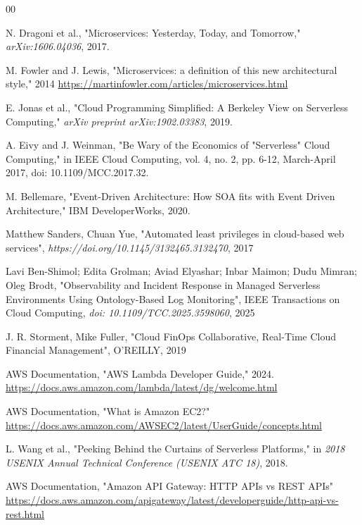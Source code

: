 %
%
\begin{thebibliography}{00}

N. Dragoni et al., "Microservices: Yesterday, Today, and Tomorrow,"  \textit{arXiv:1606.04036}, 2017.

M. Fowler and J. Lewis, "Microservices: a definition of this new architectural style," 2014 \url{https://martinfowler.com/articles/microservices.html}

E. Jonas et al., "Cloud Programming Simplified: A Berkeley View on Serverless Computing," \textit{arXiv preprint arXiv:1902.03383}, 2019.

A. Eivy and J. Weinman, "Be Wary of the Economics of "Serverless" Cloud Computing," in IEEE Cloud Computing, vol. 4, no. 2, pp. 6-12, March-April 2017, doi: 10.1109/MCC.2017.32.

M. Bellemare, "Event-Driven Architecture: How SOA fits with Event Driven Architecture," IBM DeveloperWorks, 2020.

Matthew Sanders, Chuan Yue, "Automated least privileges in cloud-based web services", \textit{https://doi.org/10.1145/3132465.3132470}, 2017

Lavi Ben-Shimol; Edita Grolman; Aviad Elyashar; Inbar Maimon; Dudu Mimran; Oleg Brodt, "Observability and Incident Response in Managed Serverless Environments Using Ontology-Based Log Monitoring", IEEE Transactions on Cloud Computing, \textit{doi: 10.1109/TCC.2025.3598060}, 2025

J. R. Storment, Mike Fuller, "Cloud FinOps Collaborative, Real-Time Cloud Financial Management", O'REILLY, 2019

AWS Documentation, "AWS Lambda Developer Guide," 2024. \url{https://docs.aws.amazon.com/lambda/latest/dg/welcome.html}

AWS Documentation, "What is Amazon EC2?"
\url{https://docs.aws.amazon.com/AWSEC2/latest/UserGuide/concepts.html}

L. Wang et al., "Peeking Behind the Curtains of Serverless Platforms," in \textit{2018 USENIX Annual Technical Conference (USENIX ATC 18)}, 2018.

AWS Documentation, "Amazon API Gateway: HTTP APIs vs REST APIs" \url{https://docs.aws.amazon.com/apigateway/latest/developerguide/http-api-vs-rest.html}


\end{thebibliography}
